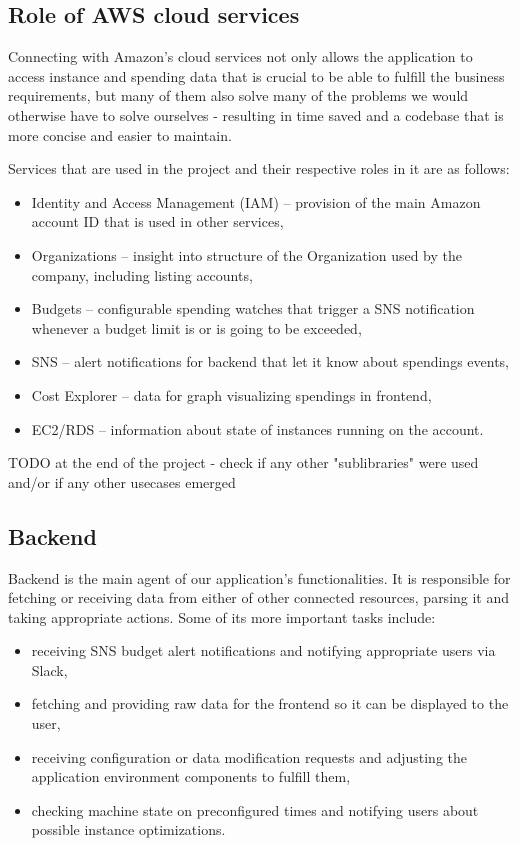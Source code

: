 \documentclass[licencjacka,en]{thesisclass}
\begin{document}
    \subsection{Role of AWS cloud services}
    Connecting with Amazon's cloud services not only allows the application to access instance and spending data
    that is crucial to be able to fulfill the business requirements,
    but many of them also solve many of the problems we would otherwise have to solve ourselves - resulting
    in time saved and a codebase that is more concise and easier to maintain.

    Services that are used in the project and their respective roles in it are as follows:
    \begin{itemize}
        \item Identity and Access Management (IAM) -- provision of the main Amazon account ID that is used in other services,
        \item Organizations -- insight into structure of the Organization used by the company, including listing accounts,
        \item Budgets -- configurable spending watches that trigger a SNS notification whenever a budget limit is or is going to be exceeded,
        \item SNS -- alert notifications for backend that let it know about spendings events,
        \item Cost Explorer -- data for graph visualizing spendings in frontend,
        \item EC2/RDS -- information about state of instances running on the account.
    \end{itemize}

    TODO at the end of the project - check if any other "sublibraries" were used and/or if any other usecases emerged

    \subsection{Backend}

    Backend is the main agent of our application's functionalities.
    It is responsible for fetching or receiving data from either of other connected resources, parsing it and taking appropriate actions.
    Some of its more important tasks include:
    \begin{itemize}
        \item receiving SNS budget alert notifications and notifying appropriate users via Slack,
        \item fetching and providing raw data for the frontend so it can be displayed to the user,
        \item receiving configuration or data modification requests and adjusting the application environment components to fulfill them,
        \item checking machine state on preconfigured times and notifying users about possible instance optimizations.
    \end{itemize}
\end{document}
